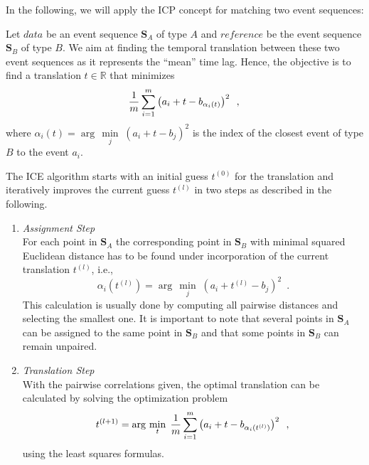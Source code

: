 \documentclass[conference]{IEEEtran}
\theoremstyle{examplestyle}
\begin{document}
In the following, we will apply the \ac{ICP} concept for matching two event sequences:

Let \(data\) be an event sequence \(\pmb{S}_A\) of type \(A\) and \(reference\) be the event sequence \(\pmb{S}_B\) of type \(B\). 
We aim at finding the temporal translation between these two event sequences as it represents the ``mean'' time lag.
Hence, the objective is to find a translation $t \in \mathbb{R}$ that minimizes 
\begin{equation}
 \dfrac{1}{m} \sum_{i = 1}^{m} \left( a_i + t - b_{\alpha_i(t)} \right)^2 \enspace , \\
\end{equation}
where $\alpha_i(t)= \arg\,\min\limits_j \; (a_i+t-b_j)^2$ is the index of the closest event of type $B$ to the event $a_i$.

The \ac{ICE} algorithm starts with an initial guess $t^{(0)}$ for the translation and iteratively improves the current guess $t^{(l)}$ in two steps as described in the following.

\begin{enumerate}
 \item \emph{Assignment Step}\\
For each point in \(\pmb{S}_A\) the corresponding point in \(\pmb{S}_B\) with minimal squared Euclidean distance has to be found under incorporation of the current translation $t^{(l)}$, i.e., 
\begin{equation}
\alpha_i(t^{(l)})= \arg\,\min\limits_j \; (a_i+t^{(l)}-b_j)^2 \enspace .
\end{equation}
This calculation is usually done by computing all pairwise distances and selecting the smallest one. It is important to note that several points in \(\pmb{S}_A\) can be assigned to the same point in \(\pmb{S}_B\) and that some points in \(\pmb{S}_B\) can remain unpaired.



\item \emph{Translation Step}\\
With the pairwise correlations given, the optimal translation can be calculated by solving the optimization problem
\begin{equation}
t^{(l+1)}= \arg\,\min\limits_{t} \; \dfrac{1}{m} \sum_{i = 1}^{m} \left( a_i + t - b_{\alpha_i(t^{(l)})} \right)^2 \enspace , \\
\end{equation}
using the least squares formulas.
 
\end{enumerate}
\end{document}
